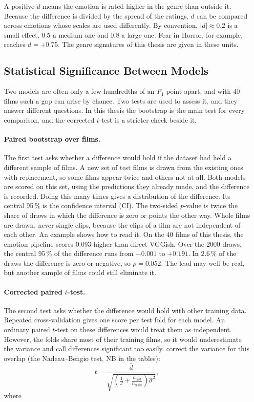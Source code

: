 \noindent A positive $d$ means the emotion is rated higher in the genre than outside it. Because the difference is divided by the spread of the ratings, $d$ can be compared across emotions whose scales are used differently. By convention, $|d| \approx 0.2$ is a small effect, $0.5$ a medium one and $0.8$ a large one. Fear in Horror, for example, reaches $d = +0.75$. The genre signatures of this thesis are given in these units.

\subsection{Statistical Significance Between Models}

Two models are often only a few hundredths of an $F_1$ point apart, and with 40 films such a gap can arise by chance. Two tests are used to assess it, and they answer different questions. In this thesis the bootstrap is the main test for every comparison, and the corrected $t$-test is a stricter check beside it.

\paragraph{Paired bootstrap over films.} The first test asks whether a difference would hold if the dataset had held a different sample of films. A new set of test films is drawn from the existing ones with replacement, so some films appear twice and others not at all. Both models are scored on this set, using the predictions they already made, and the difference is recorded. Doing this many times gives a distribution of the difference. Its central 95\,\% is the confidence interval (CI). The two-sided $p$-value is twice the share of draws in which the difference is zero or points the other way. Whole films are drawn, never single clips, because the clips of a film are not independent of each other. An example shows how to read it. On the 40 films of this thesis, the emotion pipeline scores 0.093 higher than direct VGGish. Over the 2000 draws, the central 95\,\% of the difference runs from $-0.001$ to $+0.191$. In 2.6\,\% of the draws the difference is zero or negative, so $p=0.052$. The lead may well be real, but another sample of films could still eliminate it.

\paragraph{Corrected paired $t$-test.} The second test asks whether the difference would hold with other training data. Repeated cross-validation gives one score per test fold for each model. An ordinary paired $t$-test on these differences would treat them as independent. However, the folds share most of their training films, so it would underestimate the variance and call differences significant too easily. \citet{nadeau2003inference} correct the variance for this overlap (the Nadeau--Bengio test, NB in the tables):
\begin{equation}
  t = \frac{\bar{d}}{\sqrt{\left(\frac{1}{J} + \frac{n_\text{test}}{n_\text{train}}\right)\hat{\sigma}^2}},
\end{equation}
where

